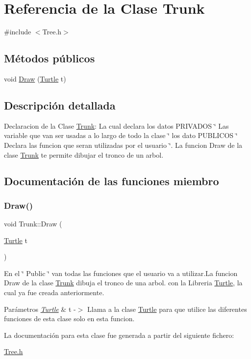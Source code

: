 \hypertarget{class_trunk}{}\section{Referencia de la Clase Trunk}
\label{class_trunk}


{\ttfamily \#include $<$Tree.\+h$>$}

\subsection*{Métodos públicos}
\begin{DoxyCompactItemize}
\item 
void \mbox{\hyperlink{class_trunk_aa3aae2a880f2f7e0ee99ea1ff76e874b}{Draw}} (\mbox{\hyperlink{class_turtle}{Turtle}} t)
\end{DoxyCompactItemize}


\subsection{Descripción detallada}
Declaracion de la Clase \mbox{\hyperlink{class_trunk}{Trunk}}\+: La cual declara los datos P\+R\+I\+V\+A\+D\+OS \char`\"{} Las variable que van ser usadas a lo largo de todo la clase \char`\"{} los dato P\+U\+B\+L\+I\+C\+OS \char`\"{} Declara las funcion que seran utilizadas por el usuario \char`\"{}. La funcion Draw de la clase \mbox{\hyperlink{class_trunk}{Trunk}} te permite dibujar el tronco de un arbol. 

\subsection{Documentación de las funciones miembro}
\mbox{\label{class_trunk_aa3aae2a880f2f7e0ee99ea1ff76e874b}} 
\subsubsection{\texorpdfstring{Draw()}{Draw()}}
{\footnotesize\ttfamily void Trunk\+::\+Draw (\begin{DoxyParamCaption}\item[{\mbox{\hyperlink{class_turtle}{Turtle}}}]{t }\end{DoxyParamCaption})\hspace{0.3cm}{\ttfamily [inline]}}

En el \char`\"{} Public \char`\"{} van todas las funciones que el usuario va a utilizar.\+La funcion Draw de la clase \mbox{\hyperlink{class_trunk}{Trunk}} dibuja el tronco de una arbol. con la Libreria \mbox{\hyperlink{class_turtle}{Turtle}}, la cual ya fue creada anteriormente.
\begin{DoxyParams}{Parámetros}
{\em \mbox{\hyperlink{class_turtle}{Turtle}}} & t -\/$>$ Llama a la clase \mbox{\hyperlink{class_turtle}{Turtle}} para que utilice las diferentes funciones de esta clase solo en esta funcion. \\
\hline
\end{DoxyParams}


La documentación para esta clase fue generada a partir del siguiente fichero\+:\begin{DoxyCompactItemize}
\item 
\mbox{\hyperlink{_tree_8h}{Tree.\+h}}\end{DoxyCompactItemize}
